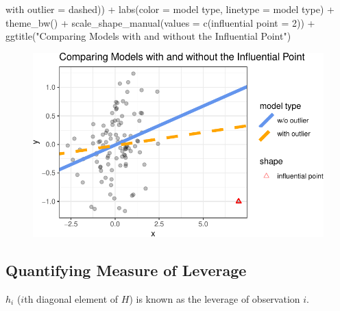\documentclass[
  letterpaper,
  DIV=11,
  numbers=noendperiod]{scrreport}
\newenvironment{Shaded}{\begin{snugshade}}{\end{snugshade}}
\newcommand{\AttributeTok}[1]{\textcolor[rgb]{0.40,0.45,0.13}{#1}}
\newcommand{\DecValTok}[1]{\textcolor[rgb]{0.68,0.00,0.00}{#1}}
\newcommand{\FunctionTok}[1]{\textcolor[rgb]{0.28,0.35,0.67}{#1}}
\newcommand{\NormalTok}[1]{\textcolor[rgb]{0.00,0.23,0.31}{#1}}
\newcommand{\OtherTok}[1]{\textcolor[rgb]{0.00,0.23,0.31}{#1}}
\newcommand{\SpecialCharTok}[1]{\textcolor[rgb]{0.37,0.37,0.37}{#1}}
\newcommand{\StringTok}[1]{\textcolor[rgb]{0.13,0.47,0.30}{#1}}
\begin{document}
\begin{Shaded}
\begin{Highlighting}[]
                                   \StringTok{\textquotesingle{}with outlier\textquotesingle{}} \OtherTok{=} \StringTok{\textquotesingle{}dashed\textquotesingle{}}\NormalTok{)) }\SpecialCharTok{+} 
  \FunctionTok{labs}\NormalTok{(}\AttributeTok{color =} \StringTok{\textquotesingle{}model type\textquotesingle{}}\NormalTok{, }\AttributeTok{linetype =} \StringTok{\textquotesingle{}model type\textquotesingle{}}\NormalTok{) }\SpecialCharTok{+} 
  \FunctionTok{theme\_bw}\NormalTok{() }\SpecialCharTok{+} 
  \FunctionTok{scale\_shape\_manual}\NormalTok{(}\AttributeTok{values =} \FunctionTok{c}\NormalTok{(}\StringTok{\textquotesingle{}influential point\textquotesingle{}} \OtherTok{=} \DecValTok{2}\NormalTok{)) }\SpecialCharTok{+} 
  \FunctionTok{ggtitle}\NormalTok{(}\StringTok{"Comparing Models with and without the Influential Point"}\NormalTok{)}
\end{Highlighting}
\end{Shaded}

\begin{figure}[H]

{\centering \includegraphics{week4/week4_files/figure-pdf/unnamed-chunk-10-2.pdf}

}

\end{figure}

\hypertarget{quantifying-measure-of-leverage}{%
\subsection{Quantifying Measure of
Leverage}\label{quantifying-measure-of-leverage}}

\(h_i\) (\(i\)th diagonal element of \(H\)) is known as the {leverage}
of observation \(i\).
\end{document}

